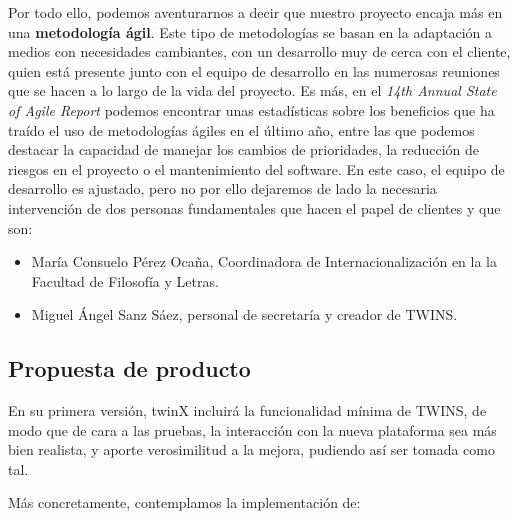 Por todo ello, podemos aventurarnos a decir que nuestro proyecto encaja más en una \textbf{metodología ágil}. Este tipo de metodologías se basan en la adaptación a medios con necesidades cambiantes, con un desarrollo muy de cerca con el cliente, quien está presente junto con el equipo de desarrollo en las numerosas reuniones que se hacen a lo largo de la vida del proyecto. Es más, en el \textit{14th Annual State of Agile Report} \cite{stateofagile} podemos encontrar unas estadísticas sobre los beneficios que ha traído el uso de metodologías ágiles en el último año, entre las que podemos destacar la capacidad de manejar los cambios de prioridades, la reducción de riesgos en el proyecto o el mantenimiento del software. En este caso, el equipo de desarrollo es ajustado, pero no por ello dejaremos de lado la necesaria intervención de dos personas fundamentales que hacen el papel de clientes y que son:

\begin{itemize}
	\item María Consuelo Pérez Ocaña, Coordinadora de Internacionalización en la la Facultad de Filosofía y Letras.
	\item Miguel Ángel Sanz Sáez, personal de secretaría y creador de TWINS.
\end{itemize}

\subsection{Propuesta de producto}
\label{subsec:propuesta}
En su primera versión, twinX incluirá la funcionalidad mínima de TWINS, de modo que de cara a las pruebas, la interacción con la nueva plataforma sea más bien realista, y aporte verosimilitud a la mejora, pudiendo así ser tomada como tal.

Más concretamente, contemplamos la implementación de:

